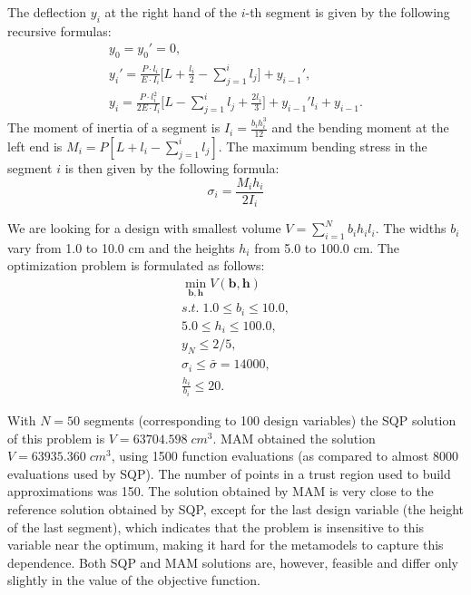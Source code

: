 \documentclass{llncs}
\begin{document}
The deflection $y_i$ at the right hand of the $i$-th segment is given by the following recursive formulas:
\begin{displaymath}
  \begin{array}{c}
    y_0=y_0'=0, \\
    y_i'=\frac{P\cdot l_i}{E\cdot I_i}\Big[ L+\frac{l_i}{2}-\sum\limits_{j=1}^i l_j\Big]+y_{i-1}', \\
    y_i=\frac{P\cdot l_i^2}{2E\cdot I_i}\Big[L-\sum\limits_{j=1}^i l_j + \frac{2l_i}{3}\Big]+y_{i-1}'l_i+y_{i-1}.
  \end{array}
\end{displaymath}
The moment of inertia of a segment is $I_i=\frac{b_i h_i^3}{12}$ and the bending moment at the left end is $M_i=P[L+l_i- \sum_{j=1}^{i}  l_j ]$. The maximum bending stress in the segment $i$ is then given by the following formula:
\begin{displaymath}
  \sigma_i=\frac{M_i h_i}{2I_i}
\end{displaymath}

We are looking for a design with smallest volume $V = \sum_{i=1}^N b_i h_i l_i$. The widths $b_i$ vary from 1.0 to 10.0 cm and the heights $h_i$ from 5.0 to 100.0 cm. The optimization problem is formulated as follows:
\begin{displaymath}
  \begin{array}{c}
    \min\limits_{\pmb b, \pmb h}V(\pmb b, \pmb h) \\
    s.t.\;1.0\le b_i \le 10.0, \\
    5.0 \le h_i \le 100.0, \\
    y_N\le 2/5, \\
    \sigma_i \le \bar{\sigma}=14000, \\
    \frac{h_i}{b_i}\le 20.
  \end{array}
\end{displaymath}

With $N=50$ segments (corresponding to 100 design variables) the SQP solution of this problem is $V = 63704.598\; cm^3$. MAM obtained the solution $V = 63935.360\; cm^3$, using 1500 function evaluations (as compared to almost 8000 evaluations used by SQP). The number of points in a trust region used to build approximations was 150. The solution obtained by MAM is very close to the reference solution obtained by SQP, except for the last design variable (the height of the last segment), which indicates that the problem is insensitive to this variable near the optimum, making it hard for the metamodels to capture this dependence. Both SQP and MAM solutions are, however, feasible and differ only slightly in the value of the objective function.
\end{document}

